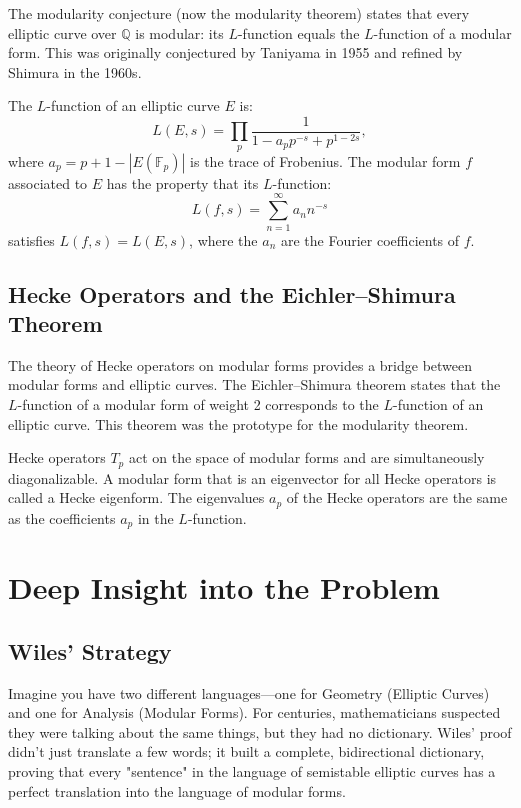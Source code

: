 The modularity conjecture (now the modularity theorem) states that every elliptic curve over $\mathbb{Q}$ is modular: its $L$-function equals the $L$-function of a modular form. This was originally conjectured by Taniyama in 1955 and refined by Shimura in the 1960s.

The $L$-function of an elliptic curve $E$ is:
\[
L(E, s) = \prod_{p} \frac{1}{1 - a_p p^{-s} + p^{1-2s}},
\]
where $a_p = p + 1 - |E(\mathbb{F}_p)|$ is the trace of Frobenius. The modular form $f$ associated to $E$ has the property that its $L$-function:
\[
L(f, s) = \sum_{n=1}^\infty a_n n^{-s}
\]
satisfies $L(f, s) = L(E, s)$, where the $a_n$ are the Fourier coefficients of $f$.

\subsection{Hecke Operators and the Eichler--Shimura Theorem}

The theory of Hecke operators on modular forms provides a bridge between modular forms and elliptic curves. The Eichler--Shimura theorem states that the $L$-function of a modular form of weight 2 corresponds to the $L$-function of an elliptic curve. This theorem was the prototype for the modularity theorem.

Hecke operators $T_p$ act on the space of modular forms and are simultaneously diagonalizable. A modular form that is an eigenvector for all Hecke operators is called a Hecke eigenform. The eigenvalues $a_p$ of the Hecke operators are the same as the coefficients $a_p$ in the $L$-function.

\section{Deep Insight into the Problem}

\subsection{Wiles' Strategy}

\begin{analogy}
Imagine you have two different languages—one for Geometry (Elliptic Curves) and one for Analysis (Modular Forms). For centuries, mathematicians suspected they were talking about the same things, but they had no dictionary. Wiles' proof didn't just translate a few words; it built a complete, bidirectional dictionary, proving that every "sentence" in the language of semistable elliptic curves has a perfect translation into the language of modular forms.
\end{analogy}

